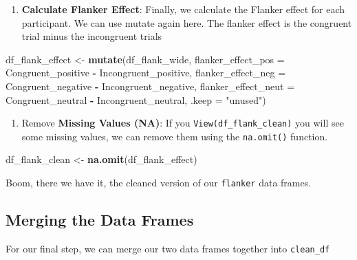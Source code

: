 \documentclass[
]{book}
\newenvironment{Shaded}{\begin{snugshade}}{\end{snugshade}}
\newcommand{\AttributeTok}[1]{\textcolor[rgb]{0.13,0.29,0.53}{#1}}
\newcommand{\FunctionTok}[1]{\textcolor[rgb]{0.13,0.29,0.53}{\textbf{#1}}}
\newcommand{\NormalTok}[1]{#1}
\newcommand{\OtherTok}[1]{\textcolor[rgb]{0.56,0.35,0.01}{#1}}
\newcommand{\SpecialCharTok}[1]{\textcolor[rgb]{0.81,0.36,0.00}{\textbf{#1}}}
\newcommand{\StringTok}[1]{\textcolor[rgb]{0.31,0.60,0.02}{#1}}
\providecommand{\tightlist}{%
  \setlength{\itemsep}{0pt}\setlength{\parskip}{0pt}}
\begin{document}
\begin{enumerate}
\def\labelenumi{\arabic{enumi}.}
\setcounter{enumi}{6}
\tightlist
\item
  \textbf{Calculate Flanker Effect}: Finally, we calculate the Flanker effect for each participant. We can use mutate again here. The flanker effect is the congruent trial minus the incongruent trials
\end{enumerate}

\begin{Shaded}
\begin{Highlighting}[]
\NormalTok{df\_flank\_effect }\OtherTok{\textless{}{-}} \FunctionTok{mutate}\NormalTok{(df\_flank\_wide,}
                         \AttributeTok{flanker\_effect\_pos =}\NormalTok{ Congruent\_positive }\SpecialCharTok{{-}}\NormalTok{ Incongruent\_positive,}
                         \AttributeTok{flanker\_effect\_neg =}\NormalTok{ Congruent\_negative }\SpecialCharTok{{-}}\NormalTok{ Incongruent\_negative,}
                         \AttributeTok{flanker\_effect\_neut =}\NormalTok{ Congruent\_neutral }\SpecialCharTok{{-}}\NormalTok{ Incongruent\_neutral,}
                         \AttributeTok{.keep =} \StringTok{"unused"}\NormalTok{)}
\end{Highlighting}
\end{Shaded}

\begin{enumerate}
\def\labelenumi{\arabic{enumi}.}
\setcounter{enumi}{7}
\tightlist
\item
  Remove \textbf{Missing Values (NA)}: If you \texttt{View(df\_flank\_clean)} you will see some missing values, we can remove them using the \texttt{na.omit()} function.
\end{enumerate}

\begin{Shaded}
\begin{Highlighting}[]
\NormalTok{df\_flank\_clean }\OtherTok{\textless{}{-}} \FunctionTok{na.omit}\NormalTok{(df\_flank\_effect)}
\end{Highlighting}
\end{Shaded}

Boom, there we have it, the cleaned version of our \texttt{flanker} data frames.

\subsection{Merging the Data Frames}\label{merging-the-data-frames}

For our final step, we can merge our two data frames together into \texttt{clean\_df}
\end{document}
